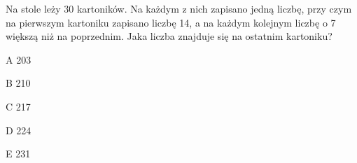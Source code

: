 \begin{tresc}
Na stole leży 30 kartoników. Na każdym z nich zapisano jedną liczbę, przy czym na pierwszym kartoniku zapisano liczbę 14, a na każdym kolejnym liczbę o 7 większą niż na poprzednim. Jaka liczba znajduje się na ostatnim kartoniku?
\end{tresc}
\begin{wariant}{A} 203 \end{wariant}
\begin{wariant}{B} 210 \end{wariant}
\begin{wariant}{C} 217 \end{wariant}
\begin{wariant}{D} 224 \end{wariant}
\begin{wariant}{E} 231 \end{wariant}

